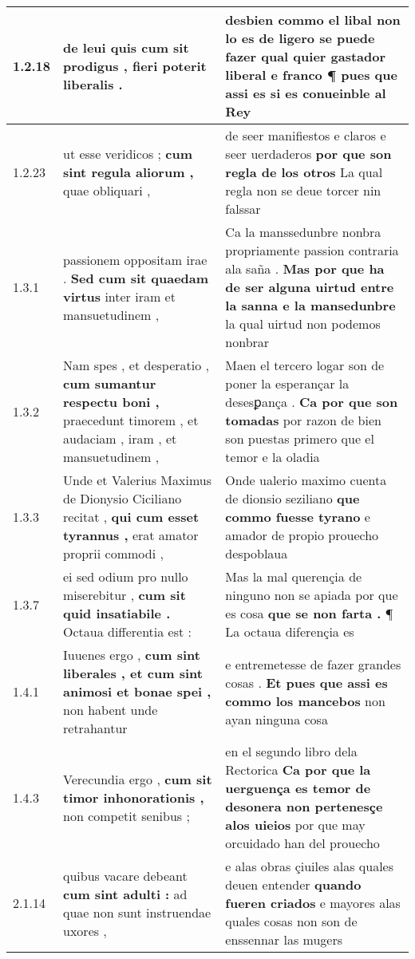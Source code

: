 \begin{tabular}{|p{1cm}|p{6.5cm}|p{6.5cm}|}
1.2.18 & de leui \textbf{ quis cum sit prodigus , } fieri poterit liberalis . & desbien commo el libal non lo es de ligero se puede fazer \textbf{ qual quier gastador liberal e franco ¶ } pues que assi es si es conueinble al Rey \\\hline
1.2.23 & ut esse veridicos ; \textbf{ cum sint regula aliorum , } quae obliquari , & de seer manifiestos e claros e seer uerdaderos \textbf{ por que son regla de los otros } La qual regla non se deue torcer nin falssar \\\hline
1.3.1 & passionem oppositam irae . \textbf{ Sed cum sit quaedam virtus } inter iram et mansuetudinem , & Ca la manssedunbre nonbra propriamente passion contraria ala saña . \textbf{ Mas por que ha de ser alguna uirtud entre la sanna e la mansedunbre } la qual uirtud non podemos nonbrar \\\hline
1.3.2 & Nam spes , et desperatio , \textbf{ cum sumantur respectu boni , } praecedunt timorem , et audaciam , iram , et mansuetudinem , & Maen el tercero logar son de poner la esperançar la desesꝑança . \textbf{ Ca por que son tomadas } por razon de bien son puestas primero que el temor e la oladia \\\hline
1.3.3 & Unde et Valerius Maximus de Dionysio Ciciliano recitat , \textbf{ qui cum esset tyrannus , } erat amator proprii commodi , & Onde ualerio maximo cuenta de dionsio seziliano \textbf{ que commo fuesse tyrano } e amador de propio prouecho despoblaua \\\hline
1.3.7 & ei sed odium pro nullo miserebitur , \textbf{ cum sit quid insatiabile . } Octaua differentia est : & Mas la mal querençia de ninguno non se apiada por que es cosa \textbf{ que se non farta . } ¶ La octaua diferençia es \\\hline
1.4.1 & Iuuenes ergo , \textbf{ cum sint liberales , et cum sint animosi et bonae spei , } non habent unde retrahantur & e entremetesse de fazer grandes cosas . \textbf{ Et pues que assi es commo los mancebos } non ayan ninguna cosa \\\hline
1.4.3 & Verecundia ergo , \textbf{ cum sit timor inhonorationis , } non competit senibus ; & en el segundo libro dela Rectorica \textbf{ Ca por que la uerguença es temor de desonera non pertenesçe alos uieios } por que may orcuidado han del prouecho \\\hline
2.1.14 & quibus vacare debeant \textbf{ cum sint adulti : } ad quae non sunt instruendae uxores , & e alas obras çiuiles alas quales deuen entender \textbf{ quando fueren criados } e mayores alas quales cosas non son de enssennar las mugers \\\hline

\end{tabular}
